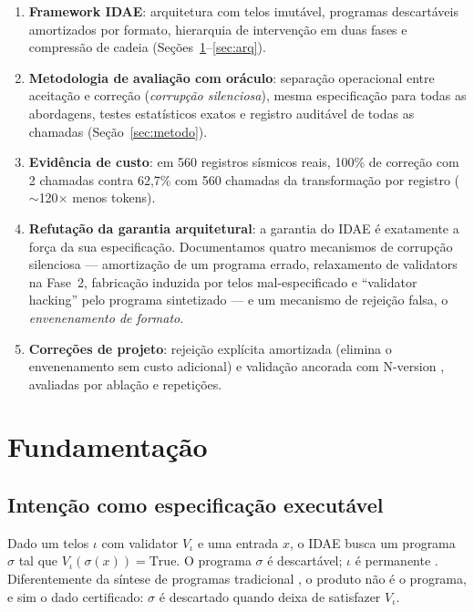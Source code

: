 \documentclass[sigconf,nonacm]{acmart}
\begin{document}
\begin{enumerate}
\item \textbf{Framework IDAE}: arquitetura com telos imutável, programas descartáveis amortizados por formato, hierarquia de intervenção em duas fases e compressão de cadeia (Seções~\ref{sec:fund}--\ref{sec:arq}).
\item \textbf{Metodologia de avaliação com oráculo}: separação operacional entre aceitação e correção (\textit{corrupção silenciosa}), mesma especificação para todas as abordagens, testes estatísticos exatos e registro auditável de todas as chamadas (Seção~\ref{sec:metodo}).
\item \textbf{Evidência de custo}: em 560 registros sísmicos reais, 100\% de correção com 2 chamadas contra 62,7\% com 560 chamadas da transformação por registro ($\sim$120$\times$ menos tokens).
\item \textbf{Refutação da garantia arquitetural}: a garantia do IDAE é exatamente a força da sua especificação. Documentamos quatro mecanismos de corrupção silenciosa --- amortização de um programa errado, relaxamento de validators na Fase~2, fabricação induzida por telos mal-especificado e ``validator hacking'' pelo programa sintetizado --- e um mecanismo de rejeição falsa, o \textit{envenenamento de formato}.
\item \textbf{Correções de projeto}: rejeição explícita amortizada (elimina o envenenamento sem custo adicional) e validação ancorada com N-version \cite{avizienis1985nversion}, avaliadas por ablação e repetições.
\end{enumerate}

\section{Fundamentação}
\label{sec:fund}

\subsection{Intenção como especificação executável}

Dado um telos $\iota$ com validator $V_\iota$ e uma entrada $x$, o IDAE busca um programa $\sigma$ tal que $V_\iota(\sigma(x)) = \text{True}$. O programa $\sigma$ é descartável; $\iota$ é permanente \cite{astrom1995adaptive,liskov2000program}. Diferentemente da síntese de programas tradicional \cite{gulwani2017program}, o produto não é o programa, e sim o dado certificado: $\sigma$ é descartado quando deixa de satisfazer $V_\iota$.
\end{document}
